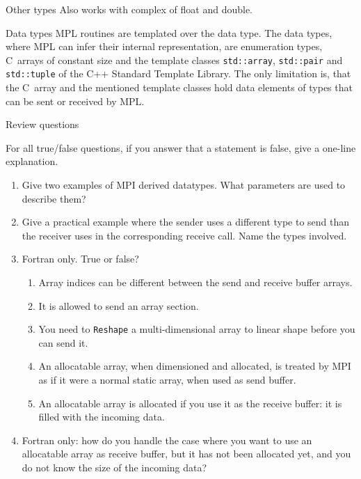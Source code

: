\begin{mplnote}{Other types}
  Also works with complex of float and double.
\end{mplnote}

\begin{mplnote}{Data types}
  MPL routines are templated over the data type.  The data types,
  where MPL can infer their internal representation, are enumeration
  types, C~arrays of constant size and the template classes
  \lstinline+std::array+,
  \lstinline+std::pair+ and
  \lstinline+std::tuple+
  of the C++ Standard Template
  Library. The only limitation is, that the C~array and the mentioned
  template classes hold data elements of types that can be sent or
  received by MPL.
\end{mplnote}










\newpage
{} {Review questions}

For all true/false questions, if you answer that a statement is false,
give a one-line explanation.

\begin{enumerate}
\item Give two examples of MPI derived datatypes. What parameters are used
to describe them?

\item Give a practical example where the sender uses a different type to send
  than the receiver uses in the corresponding receive call. Name the types involved.

\item Fortran only. True or false?
  \begin{enumerate}
  \item Array indices can be different between the send and receive buffer arrays.
  \item It is allowed to send an array section.
  \item You need to \lstinline{Reshape} a multi-dimensional array
    to linear shape before you can send it.
  \item An allocatable array, when dimensioned and allocated, is
    treated by MPI as if it were a normal static array, when used as
    send buffer.
  \item An allocatable array is allocated if you use it as the receive
    buffer: it is filled with the incoming data.
  \end{enumerate}
\item Fortran only: how do you handle the case where you want to use
  an allocatable array as receive buffer, but it has not been
  allocated yet, and you do not know the size of the incoming data?

\end{enumerate}

